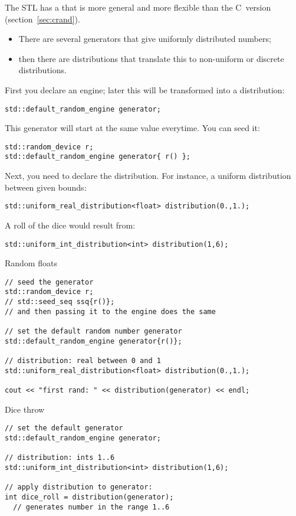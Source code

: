 The \ac{STL} has a
that is more general and more flexible than the C~version (section~\ref{sec:crand}).
\begin{itemize}
\item There are several generators that give uniformly distributed
  numbers;
\item then there are distributions that translate this to non-uniform
  or discrete distributions.
\end{itemize}

First you declare an engine; later this will be transformed into a distribution:
\begin{lstlisting}
std::default_random_engine generator;
\end{lstlisting}

This generator will start at the same value everytime.
You can seed it:
\begin{lstlisting}
std::random_device r;
std::default_random_engine generator{ r() };
\end{lstlisting}

Next, you need to declare the distribution.
For instance, a uniform distribution between given bounds:
\begin{lstlisting}
std::uniform_real_distribution<float> distribution(0.,1.);
\end{lstlisting}
A roll of the dice would result from:
\begin{lstlisting}
std::uniform_int_distribution<int> distribution(1,6);
\end{lstlisting}

 {Random floats}

\begin{lstlisting}
// seed the generator
std::random_device r;
// std::seed_seq ssq{r()};
// and then passing it to the engine does the same

// set the default random number generator
std::default_random_engine generator{r()};

// distribution: real between 0 and 1
std::uniform_real_distribution<float> distribution(0.,1.);

cout << "first rand: " << distribution(generator) << endl;
\end{lstlisting}

 {Dice throw}

\begin{lstlisting}
// set the default generator
std::default_random_engine generator;

// distribution: ints 1..6
std::uniform_int_distribution<int> distribution(1,6);

// apply distribution to generator:
int dice_roll = distribution(generator);
  // generates number in the range 1..6 
\end{lstlisting}

